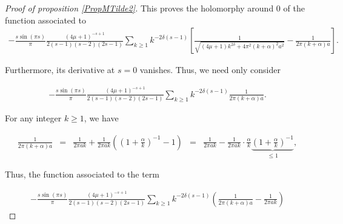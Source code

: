 \documentclass{jams-l}
\theoremstyle{definition}
\theoremstyle{remark}
\numberwithin{equation}{section}
\begin{document}
\begin{proof}[Proof of proposition \ref{PropMTilde2}]
                        \noindent This proves the holomorphy around $0$ of the function associated to
                        \[ \begin{array}{c}
                                - \frac{s \sin \left( \pi s \right)}{\pi} \frac{\left( 4 \mu + 1 \right)^{-s+1}}{2 \left( s-1 \right) \left( s - 2 \right) \left( 2s-1 \right)} \sum\limits_{k \geqslant 1} k^{-2 \delta \left( s - 1 \right)} \left[ \frac{1}{\sqrt{\left( 4 \mu + 1 \right) k^{2 \delta} + 4 \pi^2 \left( k + \alpha \right)^2 a^2}} - \frac{1}{2 \pi \left( k + \alpha \right) a} \right].
                            \end{array} \]
                        
                        \noindent Furthermore, its derivative at $s=0$ vanishes. Thus, we need only consider
                        
                        \[ \begin{array}{c}
                                - \frac{s \sin \left( \pi s \right)}{\pi} \frac{\left( 4 \mu + 1 \right)^{-s+1}}{2 \left( s-1 \right) \left( s - 2 \right) \left( 2s-1 \right)} \sum\limits_{k \geqslant 1} k^{-2 \delta \left( s - 1 \right)} \frac{1}{2 \pi \left( k + \alpha \right) a}.
                            \end{array} \]
                        
                        \noindent For any integer $k \geqslant 1$, we have
                        
                        \[ \begin{array}{lllll}
                                \scriptstyle \frac{1}{2 \pi \left( k + \alpha \right) a} & \scriptstyle = & \scriptstyle \frac{1}{2 \pi a k} + \frac{1}{2 \pi a k} \left( \left( 1 + \frac{\alpha}{k} \right)^{-1} - 1 \right) & \scriptstyle = & \scriptstyle \frac{1}{2 \pi a k} - \frac{1}{2 \pi a k} \cdot \frac{\alpha}{k} \underbrace{\scriptstyle \left( 1 + \frac{\alpha}{k} \right)^{-1}}_{\scriptstyle \leqslant 1},
                            \end{array} \]
                        
                        \noindent Thus, the function associated to the term
                        
                        \[ \begin{array}{c}
                                - \frac{s \sin \left( \pi s \right)}{\pi} \frac{\left( 4 \mu + 1 \right)^{-s+1}}{2 \left( s-1 \right) \left( s - 2 \right) \left( 2s-1 \right)} \sum\limits_{k \geqslant 1} k^{-2 \delta \left( s - 1 \right)} \left( \frac{1}{2 \pi \left( k + \alpha \right) a} - \frac{1}{2 \pi a k} \right)
                            \end{array} \]
                        

\end{proof}
\end{document}
